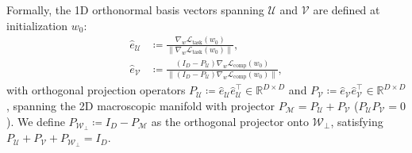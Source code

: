 \documentclass{article}
\theoremstyle{plain}
\theoremstyle{definition}
\begin{document}
Formally, the 1D orthonormal basis vectors spanning $\mathcal{U}$ and $\mathcal{V}$ are defined at initialization $w_0$:
\begin{align}
    \hat{e}_{\mathcal{U}} &\coloneqq \frac{\nabla_w \mathcal{L}_{\text{task}}(w_0)}{\|\nabla_w \mathcal{L}_{\text{task}}(w_0)\|}, \label{eq:app_e_u_def} \\
    \hat{e}_{\mathcal{V}} &\coloneqq \frac{(I_D - P_{\mathcal{U}}) \nabla_w \mathcal{L}_{\text{comp}}(w_0)}{\|(I_D - P_{\mathcal{U}}) \nabla_w \mathcal{L}_{\text{comp}}(w_0)\|}, \label{eq:app_e_v_def}
\end{align}
with orthogonal projection operators $P_{\mathcal{U}} \coloneqq \hat{e}_{\mathcal{U}} \hat{e}_{\mathcal{U}}^\top \in \mathbb{R}^{D \times D}$ and $P_{\mathcal{V}} \coloneqq \hat{e}_{\mathcal{V}} \hat{e}_{\mathcal{V}}^\top \in \mathbb{R}^{D \times D}$, spanning the 2D macroscopic manifold with projector $P_{\mathcal{M}} = P_{\mathcal{U}} + P_{\mathcal{V}}$ ($P_{\mathcal{U}} P_{\mathcal{V}} = 0$). We define $P_{\mathcal{W}_\perp} \coloneqq I_D - P_{\mathcal{M}}$ as the orthogonal projector onto $\mathcal{W}_\perp$, satisfying $P_{\mathcal{U}} + P_{\mathcal{V}} + P_{\mathcal{W}_\perp} = I_D$.
\end{document}
